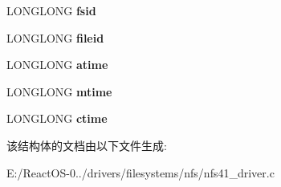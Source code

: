 \begin{DoxyCompactItemize}
\begin{tabbing}
\end{tabbing}\item 
\mbox{\label{struct__nfs3__attrs_a789106a34e59cb62af537256186c26bc}} 
L\+O\+N\+G\+L\+O\+NG {\bfseries fsid}
\item 
\mbox{\label{struct__nfs3__attrs_a5209e757682990ec0852aa91f678bccd}} 
L\+O\+N\+G\+L\+O\+NG {\bfseries fileid}
\item 
\mbox{\label{struct__nfs3__attrs_a919e3372030b4ce721863cd926055f5f}} 
L\+O\+N\+G\+L\+O\+NG {\bfseries atime}
\item 
\mbox{\label{struct__nfs3__attrs_a0fd494d776dacf7c614bd73110f13c90}} 
L\+O\+N\+G\+L\+O\+NG {\bfseries mtime}
\item 
\mbox{\label{struct__nfs3__attrs_aaabfa8709ba4985643d04ef3e23ccfa0}} 
L\+O\+N\+G\+L\+O\+NG {\bfseries ctime}
\end{DoxyCompactItemize}


该结构体的文档由以下文件生成\+:\begin{DoxyCompactItemize}
\item 
E\+:/\+React\+O\+S-\/0../drivers/filesystems/nfs/nfs41\+\_\+driver.\+c\end{DoxyCompactItemize}
